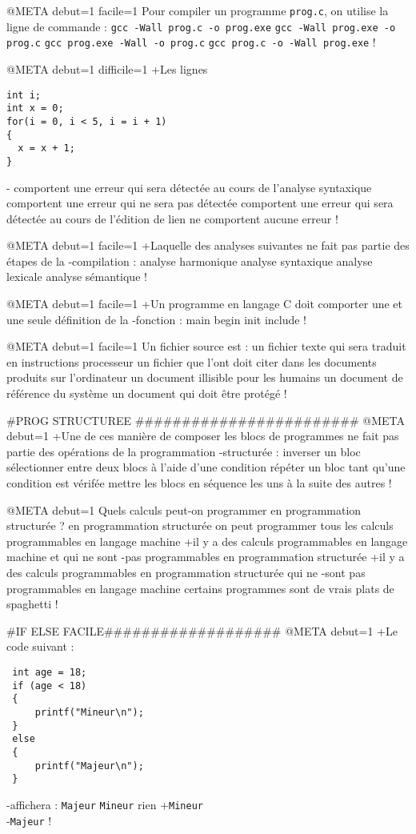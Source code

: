 @META debut=1 facile=1
Pour compiler un programme \verb|prog.c|, on utilise la ligne de commande : 
 \verb|gcc -Wall prog.c -o prog.exe|
 \verb|gcc -Wall prog.exe -o prog.c|
 \verb|gcc prog.exe -Wall -o prog.c|
 \verb|gcc prog.c -o -Wall prog.exe|
!

@META debut=1 difficile=1
+Les lignes
\begin{verbatim}
int i;
int x = 0;
for(i = 0, i < 5, i = i + 1)
{
  x = x + 1;
}
\end{verbatim}
-
 comportent une erreur qui sera détectée au cours de l'analyse syntaxique
 comportent une erreur qui ne sera pas détectée
 comportent une erreur qui sera détectée au cours de l'édition de lien
 ne comportent aucune erreur
!

@META debut=1 facile=1
+Laquelle des analyses suivantes ne fait pas partie des étapes de la
-compilation :
 analyse harmonique
 analyse syntaxique
 analyse lexicale
 analyse sémantique
!

@META debut=1 facile=1
+Un programme en langage C doit comporter une et une seule définition de la
-fonction :
 main
 begin
 init
 include
!

@META debut=1 facile=1
Un fichier source est :
 un fichier texte qui sera traduit en instructions processeur
 un fichier que l'ont doit citer dans les documents produits sur l'ordinateur
 un document illisible pour les humains
 un document de référence du système
 un document qui doit être protégé
!

#PROG STRUCTUREE ########################
@META debut=1
+Une de ces manière de composer les blocs de
programmes ne fait pas partie des opérations de la programmation
-structurée :
 inverser un bloc
 sélectionner entre deux blocs à l'aide d'une condition
 répéter un bloc tant qu'une condition est vérifée
 mettre les blocs en séquence les uns à la suite des autres
!

@META debut=1
Quels calculs peut-on programmer en programmation structurée ?
 en programmation structurée on peut programmer tous les calculs programmables en langage machine
+il y a des calculs programmables en langage machine et qui ne sont
-pas programmables en programmation structurée
+il y a des calculs programmables en programmation structurée qui ne
-sont pas programmables en langage machine
 certains programmes sont de vrais plats de spaghetti
!

#IF ELSE FACILE###################
@META debut=1
+Le code suivant :
 \begin{verbatim}
 int age = 18;
 if (age < 18)
 {
     printf("Mineur\n"); 
 }
 else
 {
     printf("Majeur\n"); 
 }
 \end{verbatim}
-affichera :
 \verb|Majeur|
 \verb|Mineur|
 rien
+\verb|Mineur|\\
-\verb|Majeur|
!

